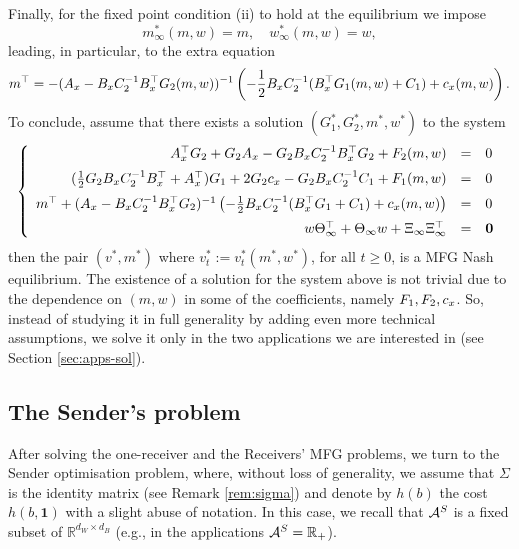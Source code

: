 \documentclass[a4paper,10pt]{article}
\newcommand{\RR}{\mathbb{R}}
\theoremstyle{definition}
\theoremstyle{plain}
\numberwithin{equation}{section}
\begin{document}
Finally, for the fixed point condition (ii) to hold at the equilibrium we impose 
\[ m^* _\infty (m,w) = m, \quad w^*_\infty (m,w) = w,\]
leading, in particular, to the extra equation
\begin{equation}\label{eq:fixed-pt}
	m^\top =  -(A_{\rm x} - B_{\rm x} C_2^{-1} B_{\rm x} ^\top G_2(m,w)) ^{-1}\left(-\frac{1}{2} B_{\rm x} C_2^{-1} (B_{\rm x} ^\top G_1(m,w) +C_1) +c_{\rm x}(m,w)\right).
\end{equation}
To conclude, assume that there exists a solution $(G_1^*, G_2^*, m^*, w^*)$ to the system
\begin{equation}
\label{eq:sys_G_i_m}
\left\{
\begin{array}{rcl}
A_{\rm x}^\top G_2 + G_2 A_{\rm x} - G_2 B_{\rm x} C_2 ^{-1} B_{\rm x} ^\top G_2 + F_2 (m,w) & = & 0 \vspace{0.2cm} \\
(\frac{1}{2}G_2 B_{\rm x} C_2^{-1} B_{\rm x} ^\top + A_{\rm x} ^\top )G_1 + 2G_2 c_{\rm x} - G_2 B_{\rm x} C_2 ^{-1} C_1 + F_1 (m,w)  &= & 0 \vspace{0.2cm}\\
m^\top + (A_{\rm x} - B_{\rm x} C_2^{-1} B_{\rm x} ^\top G_2 ) ^{-1}\left(-\frac{1}{2} B_{\rm x} C_2^{-1} (B_{\rm x} ^\top G_1 +C_1) +c_{\rm x}(m,w)\right) &= & 0 \vspace{0.2cm} \\
w \Theta_\infty ^\top + \Theta_\infty  w +\Xi_\infty \Xi_\infty^\top  & =& \bold{0}
\end{array}
\right.
\end{equation}
then the pair $(v^*,m^*)$ where $v_t ^* := v_t ^*(m^*, w^*)$, for all $t\geq 0$, is a MFG Nash equilibrium. The existence of a solution for the system above is not trivial due to the dependence on $(m,w)$ in some of the coefficients, namely $F_1,F_2,c_{\rm x}$. So, instead of studying it in full generality by adding even more technical assumptions, we solve it only in the two applications we are interested in (see Section \ref{sec:apps-sol}).  

\subsection{The Sender's problem}\label{sec:Sender_erg}
After solving the one-receiver and the Receivers' MFG problems, we turn to the Sender optimisation problem, where, without loss of generality,  we assume that $\Sigma$ is the identity matrix (see Remark \ref{rem:sigma}) and denote by $h(b)$ the cost $h(b,\mathbf 1)$ with a slight abuse of notation. In this case, we recall that $\mathcal A^{\rm S}$ is a fixed subset of $\mathbb R^{d_W \times d_B}$ (e.g., in the applications $\mathcal A^{\rm S} = \RR_+$).
\end{document}
